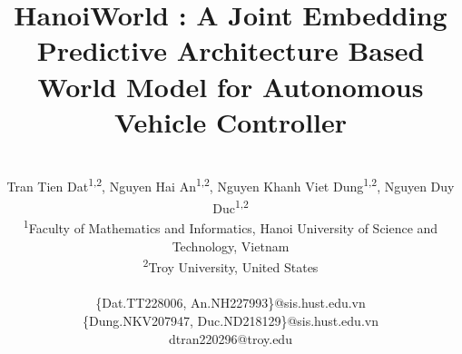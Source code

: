 \documentclass[12pt]{article}
\title{%
HanoiWorld :  A Joint Embedding Predictive Architecture Based World Model for Autonomous Vehicle Controller%
}
\author{%
\\[0.5cm]
Tran Tien Dat\textsuperscript{1,2}, Nguyen Hai An\textsuperscript{1,2}, Nguyen Khanh Viet Dung\textsuperscript{1,2}, Nguyen Duy Duc\textsuperscript{1,2}\\[0.5em]
{\small
\textsuperscript{1}Faculty of Mathematics and Informatics, Hanoi University of Science and Technology, Vietnam\\[0.3em]
\textsuperscript{2}Troy University, United States}\\[0.8em]
\centerline{\ttfamily
\{Dat.TT228006, An.NH227993\}@sis.hust.edu.vn}
\centerline{\ttfamily
\{Dung.NKV207947, Duc.ND218129\}@sis.hust.edu.vn}
\centerline{\ttfamily dtran220296@troy.edu}
}
\date{} %
\begin{document}
\begin{samepage}
\maketitle
\end{samepage}

\onehalfspacing

\begin{abstract}

\end{abstract}







\newpage



\newpage

\end{document}
